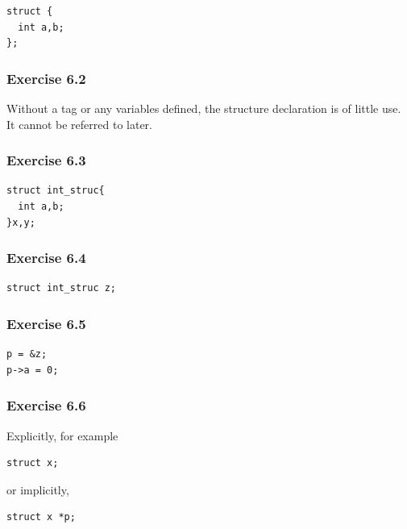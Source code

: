    \begin{Verbatim}
struct {
  int a,b;
};
\end{Verbatim}

  

  \subsubsection*{Exercise 6.2}

   Without a tag or any variables defined, the structure declaration is of
    little use. It cannot be referred to later.


  

  \subsubsection*{Exercise 6.3}

   \begin{Verbatim}
struct int_struc{
  int a,b;
}x,y;
\end{Verbatim}

  

  \subsubsection*{Exercise 6.4}

   \begin{Verbatim}
struct int_struc z;
\end{Verbatim}

  

  \subsubsection*{Exercise 6.5}

   \begin{Verbatim}
p = &z;
p->a = 0;
\end{Verbatim}

  

  \subsubsection*{Exercise 6.6}

   Explicitly, for example


   \begin{Verbatim}
struct x;
\end{Verbatim}

   or implicitly,


   \begin{Verbatim}
struct x *p;
\end{Verbatim}

